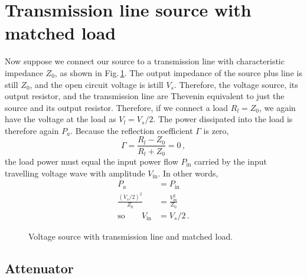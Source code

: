\documentclass[twocolumn]{article}
\begin{document}
\section{Transmission line source with matched load}

Now suppose we connect our source to a transmission line with characteristic impedance $Z_0$, as shown in Fig.\,\ref{fig:tline_matched_load}.
The output impedance of the source plus line is still $Z_0$, and the open circuit voltage is istill $V_s$.
Therefore, the voltage source, its output resistor, and the transmission line are Thevenin equivalent to just the source and its output resistor.
Therefore, if we connect a load $R_l=Z_0$, we again have the voltage at the load as $V_l = V_s/2$.
The power dissipated into the load is therefore again $P_a$.
Because the reflection coefficient $\Gamma$ is zero,
\begin{equation}
\Gamma = \frac{R_l - Z_0}{R_l + Z_0} = 0 \, ,
\end{equation}
the load power must equal the input power flow $P_{\text{in}}$ carried by the input travelling voltage wave with amplitude $V_{\text{in}}$.
In other words,
\begin{align}
P_a &= P_\text{in} \nonumber \\
\frac{(V_s/2)^2}{Z_0} &= \frac{V_{\text{in}}^2}{Z_0} \nonumber \\
\text{so} \qquad V_{\text{in}} &= V_s/2 \, .
\end{align}

\begin{figure}
\begin{centering}
\par\end{centering}
\caption{Voltage source with transmission line and matched load.}
\label{fig:tline_matched_load}
\end{figure}

\subsection{Attenuator}
\end{document}
